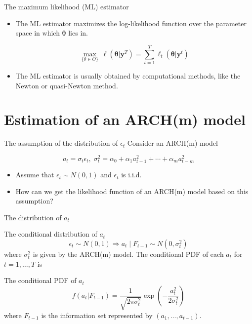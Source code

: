 \documentclass[presentation,10pt]{beamer}
\begin{document}
\begin{frame}[label={sec:org5bcd707}]{The maximum likelihood (ML) estimator}
\begin{itemize}
\item The ML estimator maximizes the log-likelihood function over the
parameter space in which \(\boldsymbol{\theta}\) lies in.

\begin{equation}
\operatorname*{max}_{\{\theta \in \Theta\}}\: \ell(\boldsymbol{\theta} | \mathbf{y}^T) = \sum_{t=1}^T \ell_t(\boldsymbol{\theta} | \mathbf{y}^t)
\end{equation}

\item The ML estimator is usually obtained by computational methods, like
the Newton or quasi-Newton method.
\end{itemize}
\end{frame}

\section{Estimation of an ARCH(m) model}
\label{sec:org8a3c952}

\begin{frame}[label={sec:org08c310f}]{The assumption of the distribution of \(\epsilon_t\)}
Consider an ARCH(m) model

\begin{equation*}
a_t = \sigma_t \epsilon_t,\; \sigma^2_t = \alpha_0 + \alpha_1 a^2_{t-1} + \cdots + \alpha_m a^2_{t-m}
\end{equation*}

\begin{itemize}
\item Assume that \(\epsilon_t \sim N(0, 1)\) and \(\epsilon_t\) is i.i.d.

\item How can we get the likelihood function of an ARCH(m) model based on
this assumption?
\end{itemize}
\end{frame}

\begin{frame}[label={sec:org3080be6}]{The distribution of \(a_t\)}
\begin{block}{The conditional distribution of \(a_t\)}
\[ \epsilon_t \sim N(0, 1) \Rightarrow a_t \mid F_{t-1} \sim N(0,
\sigma^2_t) \] 
where \(\sigma^2_t\) is given by the ARCH(m) model. The
conditional PDF of each \(a_t\) for \(t=1, \ldots, T\) is
\end{block}

\begin{block}{The conditional PDF of \(a_t\)}
\[
f(a_t | F_{t-1}) = \frac{1}{\sqrt{2 \pi \sigma^2_t}} \exp
\left(-\frac{a^2_t}{2\sigma^2_t}\right)
\] 
where \(F_{t-1}\) is the information set represented by \((a_1, \ldots,
a_{t-1})\).
\end{block}
\end{frame}
\end{document}
